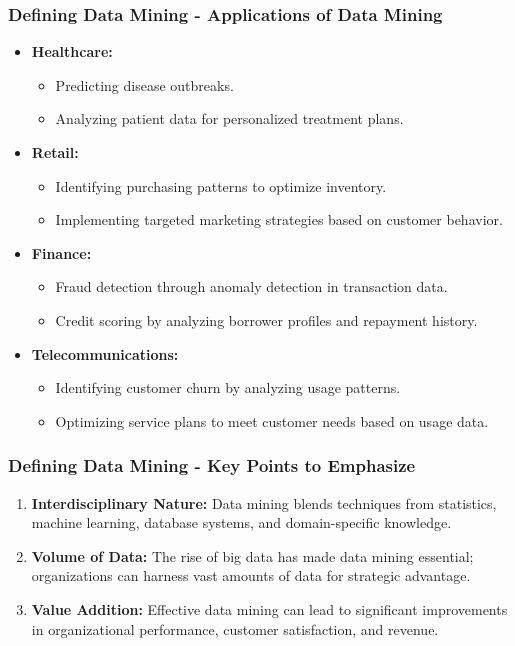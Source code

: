\documentclass{beamer}
\begin{document}
\begin{frame}[fragile]
    \frametitle{Defining Data Mining - Applications of Data Mining}
    \begin{itemize}
        \item \textbf{Healthcare:} 
        \begin{itemize}
            \item Predicting disease outbreaks.
            \item Analyzing patient data for personalized treatment plans.
        \end{itemize}
        \item \textbf{Retail:} 
        \begin{itemize}
            \item Identifying purchasing patterns to optimize inventory.
            \item Implementing targeted marketing strategies based on customer behavior.
        \end{itemize}
        \item \textbf{Finance:}
        \begin{itemize}
            \item Fraud detection through anomaly detection in transaction data.
            \item Credit scoring by analyzing borrower profiles and repayment history.
        \end{itemize}
        \item \textbf{Telecommunications:}
        \begin{itemize}
            \item Identifying customer churn by analyzing usage patterns.
            \item Optimizing service plans to meet customer needs based on usage data.
        \end{itemize}
    \end{itemize}
\end{frame}

\begin{frame}[fragile]
    \frametitle{Defining Data Mining - Key Points to Emphasize}
    \begin{enumerate}
        \item \textbf{Interdisciplinary Nature:} Data mining blends techniques from statistics, machine learning, database systems, and domain-specific knowledge.
        \item \textbf{Volume of Data:} The rise of big data has made data mining essential; organizations can harness vast amounts of data for strategic advantage.
        \item \textbf{Value Addition:} Effective data mining can lead to significant improvements in organizational performance, customer satisfaction, and revenue.
    \end{enumerate}
\end{frame}
\end{document}
